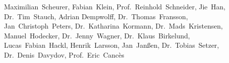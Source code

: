 Maximilian~Scheurer,
Fabian~Klein,
Prof.~Reinhold~Schneider,
Jie~Han,
Dr.~Tim~Stauch,
Adrian Dempwolff,
Dr.~Thomas~Fransson,
Jan~Christoph~Peters,
Dr.~Katharina~Kormann,
Dr.~Mads~Kristensen,
Manuel~Hodecker,
Dr.~Jenny~Wagner,
Dr.~Klaus~Birkelund,
Lucas~Fabian~Hackl,
Henrik~Larsson,
Jan~Janßen,
Dr.~Tobias~Setzer,
Dr.~Denis~Davydov,
Prof.~Eric~Cancès